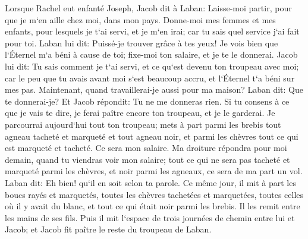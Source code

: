 \verse Lorsque Rachel eut enfanté Joseph, Jacob dit à Laban: Laisse-moi partir, pour que je m`en aille chez moi, dans mon pays. 
\verse Donne-moi mes femmes et mes enfants, pour lesquels je t`ai servi, et je m`en irai; car tu sais quel service j`ai fait pour toi. 
\verse Laban lui dit: Puissé-je trouver grâce à tes yeux! Je vois bien que l`Éternel m`a béni à cause de toi; 
\verse fixe-moi ton salaire, et je te le donnerai. 
\verse Jacob lui dit: Tu sais comment je t`ai servi, et ce qu`est devenu ton troupeau avec moi; 
\verse car le peu que tu avais avant moi s`est beaucoup accru, et l`Éternel t`a béni sur mes pas. Maintenant, quand travaillerai-je aussi pour ma maison? 
\verse Laban dit: Que te donnerai-je? Et Jacob répondit: Tu ne me donneras rien. Si tu consens à ce que je vais te dire, je ferai paître encore ton troupeau, et je le garderai. 
\verse Je parcourrai aujourd`hui tout ton troupeau; mets à part parmi les brebis tout agneau tacheté et marqueté et tout agneau noir, et parmi les chèvres tout ce qui est marqueté et tacheté. Ce sera mon salaire. 
\verse Ma droiture répondra pour moi demain, quand tu viendras voir mon salaire; tout ce qui ne sera pas tacheté et marqueté parmi les chèvres, et noir parmi les agneaux, ce sera de ma part un vol. 
\verse Laban dit: Eh bien! qu`il en soit selon ta parole. 
\verse Ce même jour, il mit à part les boucs rayés et marquetés, toutes les chèvres tachetées et marquetées, toutes celles où il y avait du blanc, et tout ce qui était noir parmi les brebis. Il les remit entre les mains de ses fils. 
\verse Puis il mit l`espace de trois journées de chemin entre lui et Jacob; et Jacob fit paître le reste du troupeau de Laban. 
